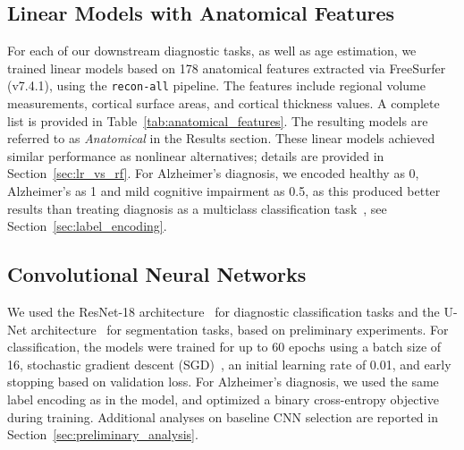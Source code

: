 \documentclass[pdflatex,sn-nature]{sn-jnl}%
\newif\ifhighlight
\newcommand{\rev}[1]{\ifhighlight{\color{blue}{}#1}\else#1\fi}%
\newcommand{\revdel}[1]{\ifhighlight{\color{red}\sout{#1}}\fi}
\theoremstyle{thmstyleone}%
\theoremstyle{thmstyletwo}%
\theoremstyle{thmstylethree}%
\begin{document}




\subsection*{Linear Models with Anatomical Features}

For each of our downstream diagnostic tasks, as well as age estimation, we trained linear models based on 178 anatomical features extracted via FreeSurfer~\citep{fischl2012freesurfer} (v7.4.1), using the \texttt{recon-all} pipeline. The features include regional volume measurements, cortical surface areas, and cortical thickness values. A complete list is provided in \revdel{Appendix} Table~\ref{tab:anatomical_features}. The resulting models are referred to as \emph{Anatomical} in the Results section. These linear models achieved similar performance as nonlinear alternatives; details are provided in \revdel{Appendix} Section~\ref{sec:lr_vs_rf}. For Alzheimer's diagnosis, we encoded healthy as 0, Alzheimer's as 1 and mild cognitive impairment as 0.5, as this produced better results than treating diagnosis as a multiclass classification task~\citep{liu2022generalizable}, see \revdel{Appendix} Section~\ref{sec:label_encoding}. 

\subsection*{Convolutional Neural Networks}
We used the ResNet-18 architecture~\citep{he2015deepresiduallearningimage} for diagnostic classification tasks and the U-Net architecture~\citep{ronneberger2015u} for segmentation tasks, based on preliminary experiments. For classification, the models were trained for up to 60 epochs using a batch size of 16, stochastic gradient descent (SGD)~\citep{ruder2017overviewgradientdescentoptimization}, an initial learning rate of 0.01, and early stopping based on validation loss. For Alzheimer's diagnosis, we used the same label encoding as in the \revdel{logistic regression} model, and optimized a binary cross-entropy objective during training. Additional analyses on baseline CNN selection are reported in \revdel{Appendix} Section~\ref{sec:preliminary_analysis}.
\end{document}
